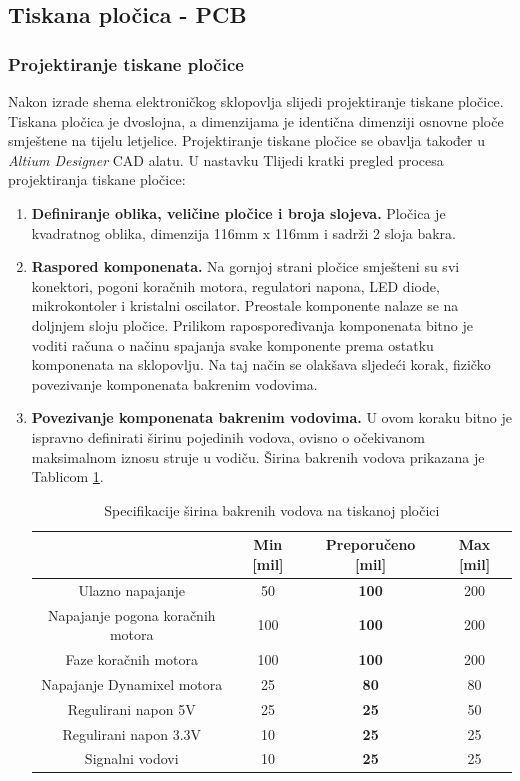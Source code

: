 \documentclass[11pt,a4paper]{article}
\begin{document}
\subsection{Tiskana pločica - PCB}

\subsubsection{Projektiranje tiskane pločice}
Nakon izrade shema elektroničkog sklopovlja slijedi projektiranje tiskane pločice. Tiskana pločica je dvoslojna, a dimenzijama je identična dimenziji osnovne ploče smještene na tijelu letjelice. Projektiranje tiskane pločice se obavlja također u \textit{Altium Designer} CAD alatu. U nastavku Tlijedi kratki pregled procesa projektiranja tiskane pločice:

\begin{center}
	\begin{enumerate}
		\item \textbf{Definiranje oblika, veličine pločice i broja slojeva.} Pločica je kvadratnog oblika, dimenzija 116mm x 116mm i sadrži 2 sloja bakra.
		
		\item \textbf{Raspored komponenata.} Na gornjoj strani pločice smješteni su svi konektori, pogoni koračnih motora, regulatori napona, LED diode, mikrokontoler i kristalni oscilator. Preostale komponente nalaze se na doljnjem sloju pločice. Prilikom rapospoređivanja komponenata bitno je voditi računa o načinu spajanja svake komponente prema ostatku komponenata na sklopovlju. Na taj način se olakšava sljedeći korak, fizičko povezivanje komponenata bakrenim vodovima.
		
		\item \textbf{Povezivanje komponenata bakrenim vodovima.} U ovom koraku bitno je ispravno definirati širinu pojedinih vodova, ovisno o očekivanom maksimalnom iznosu struje u vodiču. Širina bakrenih vodova prikazana je Tablicom \ref{tab:specifikacija_pcb_with}.

\begin{table}[H]
	\centering
	\caption{Specifikacije širina bakrenih vodova na tiskanoj pločici}
	\label{tab:specifikacija_pcb_with}
	\begin{tabular}{|c|c|c|c|}
			\hline 
		  					& \textbf{Min [mil]} 	& \textbf{Preporučeno [mil]}	& \textbf{Max [mil]} \\ \hline  \hline
		 Ulazno napajanje 	& 50 	& \textbf{100} 			& 200 \\ \hline
		 Napajanje pogona koračnih motora 	& 100 	& \textbf{100} 			& 200 \\ \hline
		 Faze koračnih motora 	& 100 	& \textbf{100} 			& 200 \\ \hline
		 Napajanje Dynamixel motora 	& 25 	& \textbf{80} 			& 80 \\ \hline
		 Regulirani napon 5V 	& 25 	& \textbf{25} 			& 50 \\ \hline
		 Regulirani napon 3.3V 	& 10 	& \textbf{25} 			& 25 \\ \hline
		 Signalni vodovi 	& 10 	& \textbf{25}			& 25 \\ \hline
	\end{tabular}
\end{table}		


\end{enumerate}
\end{center}
\end{document}

